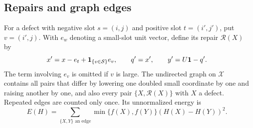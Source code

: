 \subsection{Repairs and graph edges}

For a defect with negative slot $s=(i,j)$ and positive slot
$t=(i',j')$, put $v=(i',j)$.  With $e_w$ denoting a small-slot unit
vector, define its repair $\mathcal R(X)$ by
\begin{equation}\label{eq:repair-map}
 x'=x-e_t+\mathbf{1}_{\{v\in\mathcal S\}}e_v,
 \qquad q'=x',\qquad y'=U\mathbf{1}-q'.
\end{equation}
The term involving $e_v$ is omitted if $v$ is large.
The undirected graph on $\mathcal X$ contains all pairs that differ by
lowering one doubled small coordinate by one and raising another by
one, and also every pair $\{X,\mathcal R(X)\}$ with $X$ a defect.
Repeated edges are counted only once.  Its unnormalized energy is
\begin{equation}\label{eq:graph-energy}
 E(H)=\sum_{\{X,Y\}\text{ an edge}}
 \min\{f(X),f(Y)\}(H(X)-H(Y))^2.
\end{equation}

